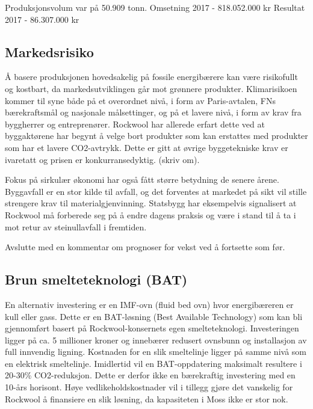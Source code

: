 \indent \newline
Produksjonsvolum var på 50.909 tonn.
Omsetning 2017 - 818.052.000 kr
Resultat 2017 - 86.307.000 kr

\subsection*{Markedsrisiko}
Å basere produksjonen hovedsakelig på fossile energibærere kan være risikofullt og kostbart, da markedsutviklingen går mot grønnere produkter. Klimarisikoen kommer til syne både på et overordnet nivå, i form av Paris-avtalen, FNs bærekraftsmål og nasjonale målsettinger, og på et lavere nivå, i form av krav fra byggherrer og entreprenører. Rockwool har allerede erfart dette ved at byggaktørene har begynt å velge bort produkter som kan erstattes med produkter som har et lavere CO2-avtrykk. Dette er gitt at øvrige byggetekniske krav er ivaretatt og prisen er konkurransedyktig.  (skriv om).

\indent \newline
Fokus på sirkulær økonomi har også fått større betydning de senere årene. Byggavfall er en stor kilde til avfall, og det forventes at markedet på sikt vil stille strengere krav til materialgjenvinning. Statsbygg har eksempelvis signalisert at Rockwool må forberede seg på å endre dagens praksis og være i stand til å ta i mot retur av steinullavfall i fremtiden. 

\indent \newline
Avslutte med en kommentar om prognoser for vekst ved å fortsette som før.


\subsection{Brun smelteteknologi (BAT)}
En alternativ investering er en IMF-ovn (fluid bed ovn) hvor energibæreren er kull eller gass. Dette er en BAT-løsning (Best Available Technology) som kan bli gjennomført basert på Rockwool-konsernets egen smelteteknologi. Investeringen ligger på ca. 5 millioner kroner og innebærer redusert ovnsbunn og installasjon av full innvendig ligning. Kostnaden for en slik smeltelinje ligger på samme nivå som en elektrisk smeltelinje. Imidlertid vil en BAT-oppdatering maksimalt resultere i 20-30\% CO2-reduksjon. Dette er derfor ikke en bærekraftig investering med en 10-års horisont. Høye vedlikeholdskostnader vil i tillegg gjøre det vanskelig for Rockwool å finansiere en slik løsning, da kapasiteten i Moss ikke er stor nok.
